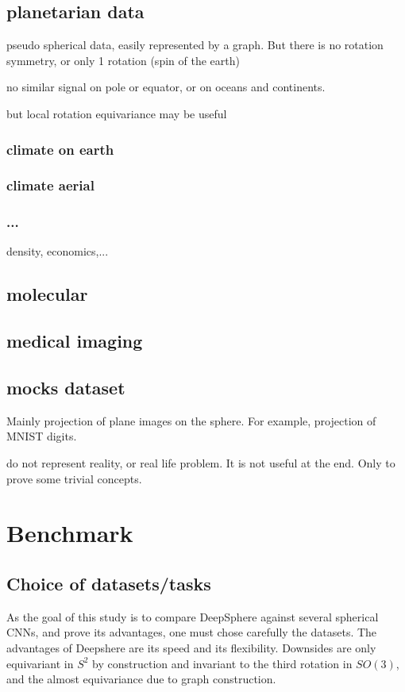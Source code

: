 \documentclass[11pt]{report}
\begin{document}
\section{planetarian data}
pseudo spherical data, easily represented by a graph.
But there is no rotation symmetry, or only 1 rotation (spin of the earth)

no similar signal on pole or equator, or on oceans and continents.

but local rotation equivariance may be useful
\subsection{climate on earth}
\subsection{climate aerial}
\subsection{...}
density, economics,...

\section{molecular}

\section{medical imaging}

\section{mocks dataset}
Mainly projection of plane images on the sphere. For example, projection of MNIST digits.

do not represent reality, or real life problem. It is not useful at the end. Only to prove some trivial concepts.

\chapter{Benchmark}

\section{Choice of datasets/tasks}
As the goal of this study is to compare DeepSphere against several spherical CNNs, and prove its advantages, one must chose carefully the datasets. The advantages of Deepshere are its speed and its flexibility. Downsides are only equivariant in $S^2$ by construction and invariant to the third rotation in $SO(3)$, and the almost equivariance due to graph construction.
\end{document}
